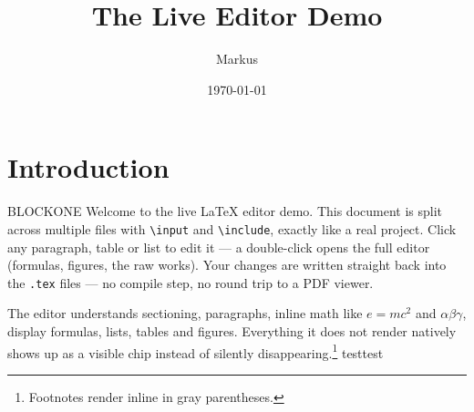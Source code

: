 \documentclass[a4paper,11pt]{article}
\title{The Live Editor Demo}
\author{Markus}
\date{\today}
\begin{document}
\maketitle


\section{Introduction}

BLOCKONE Welcome to the live LaTeX editor demo. This document is split across
multiple files with \texttt{\textbackslash input} and
\texttt{\textbackslash include}, exactly like a real project.
Click any paragraph, table or list to edit it --- a double-click opens
the full editor (formulas, figures, the raw works).
Your changes are written straight back into the \texttt{.tex} files ---
no compile step, no round trip to a PDF viewer.

The editor understands sectioning, paragraphs, inline math like
$e = mc^2$ and $\alpha \beta \gamma$, display formulas, lists, tables
and figures. Everything it does not render natively shows up as a
visible chip instead of silently disappearing.\footnote{Footnotes
render inline in gray parentheses.} testtest





\end{document}
